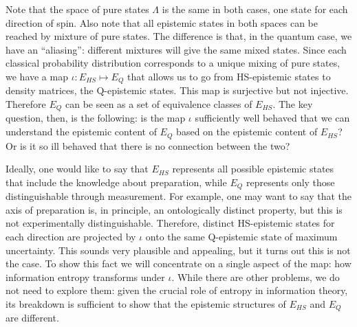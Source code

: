 \documentclass[twocolumn,prl,floatfix,superscriptaddress]{revtex4-2}
\begin{document}
Note that the space of pure states $\Lambda$ is the same in both cases, one state for each direction of spin. Also note that all epistemic states in both spaces can be reached by mixture of pure states. The difference is that, in the quantum case, we have an ``aliasing'': different mixtures will give the same mixed states. Since each classical probability distribution corresponds to a unique mixing of pure states, we have a map $\iota : E_{HS} \mapsto E_{Q}$ that allows us to go from HS-epistemic states to density matrices, the Q-epistemic states. This map is surjective but not injective. Therefore $E_{Q}$ can be seen as a set of equivalence classes of $E_{HS}$. The key question, then, is the following: is the map $\iota$ sufficiently well behaved that we can understand the epistemic content of $E_{Q}$ based on the epistemic content of $E_{HS}$? Or is it so ill behaved that there is no connection between the two?

Ideally, one would like to say that $E_{HS}$ represents all possible epistemic states that include the knowledge about preparation, while $E_{Q}$ represents only those distinguishable through measurement. For example, one may want to say that the axis of preparation is, in principle, an ontologically distinct property, but this is not experimentally distinguishable. Therefore, distinct HS-epistemic states for each direction are projected by $\iota$ onto the same Q-epistemic state of maximum uncertainty. This sounds very plausible and appealing, but it turns out this is not the case. To show this fact we will concentrate on a single aspect of the map: how information entropy transforms under $\iota$. While there are other problems, we do not need to explore them: given the crucial role of entropy in information theory, its breakdown is sufficient to show that the epistemic structures of $E_{HS}$ and $E_{Q}$ are different.
\end{document}
